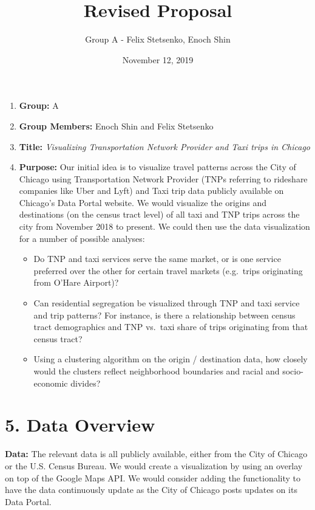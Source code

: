\documentclass[]{article}
\title{Revised Proposal}
\author{Group A - Felix Stetsenko, Enoch Shin}
\date{November 12, 2019}
\begin{document}
\maketitle

\begin{enumerate}
\def\labelenumi{\arabic{enumi}.}
\item
  \textbf{Group:} A
\item
  \textbf{Group Members:} Enoch Shin and Felix Stetsenko
\item
  \textbf{Title:} \emph{Visualizing Transportation Network Provider and
  Taxi trips in Chicago}
\item
  \textbf{Purpose:} Our initial idea is to visualize travel patterns
  across the City of Chicago using Transportation Network Provider (TNPs
  referring to rideshare companies like Uber and Lyft) and Taxi trip
  data publicly available on Chicago's Data Portal website. We would
  visualize the origins and destinations (on the census tract level) of
  all taxi and TNP trips across the city from November 2018 to present.
  We could then use the data visualization for a number of possible
  analyses:

  \begin{itemize}
  \item
    Do TNP and taxi services serve the same market, or is one service
    preferred over the other for certain travel markets (e.g.~trips
    originating from O'Hare Airport)?
  \item
    Can residential segregation be visualized through TNP and taxi
    service and trip patterns? For instance, is there a relationship
    between census tract demographics and TNP vs.~taxi share of trips
    originating from that census tract?
  \item
    Using a clustering algorithm on the origin / destination data, how
    closely would the clusters reflect neighborhood boundaries and
    racial and socio-economic divides?
  \end{itemize}
\end{enumerate}

\hypertarget{data-overview}{%
\section{5. Data Overview}\label{data-overview}}

\textbf{Data:} The relevant data is all publicly available, either from
the City of Chicago or the U.S. Census Bureau. We would create a
visualization by using an overlay on top of the Google Maps API. We
would consider adding the functionality to have the data continuously
update as the City of Chicago posts updates on its Data Portal.
\end{document}

